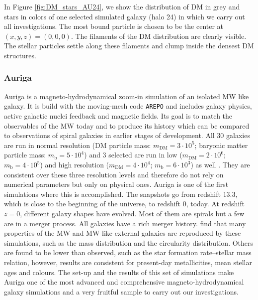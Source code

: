 In Figure \ref{fig:DM_stars_AU24}, we show the distribution of \ac{DM} in grey and stars in colors of one selected simulated galaxy (halo 24) in which we carry out all investigations. The most bound particle is chosen to be the center at $(x,y,z) = (0,0,0)$. The filaments of the \ac{DM} distribution are clearly visible. The stellar particles settle along these filaments and clump inside the densest \ac{DM} structures. 

\subsubsection{Auriga}\label{subsubsec:auriga_intro}
Auriga is a magneto-hydrodynamical zoom-in simulation of an isolated \ac{MW} like galaxy. It is build with the moving-mesh code \texttt{AREPO} \citep{AREPO} and includes galaxy physics, active galactic nuclei feedback and magnetic fields. Its goal is to match the observables of the \ac{MW} today and to produce its history which can be compared to observations of spiral galaxies in earlier stages of development. All 30 galaxies are run in normal resolution (\ac{DM} particle mass: $m_\mathrm{DM} = 3\cdot10^5$; baryonic matter particle mass: $m_\mathrm{b} = 5\cdot10^4$) and 3 selected are run in low ($m_\mathrm{DM} = 2\cdot10^6$; $m_\mathrm{b} = 4\cdot10^5$) and high resolution ($m_\mathrm{DM} = 4\cdot10^4$; $m_\mathrm{b} = 6\cdot10^3$) as well . They are consistent over these three resolution levels and therefore do not rely on numerical parameters but only on physical ones. Auriga is one of the first simulations where this is accomplished. The snapshots go from redshift $13.3$, which is close to the beginning of the universe, to redshift $0$, today.  At redshift $z= 0$, different galaxy shapes have evolved. Most of them are spirals but a few are in a merger process. All galaxies have a rich merger history.  find that many properties of the \ac{MW} and \ac{MW} like external galaxies are reproduced by these simulations, such as the mass distribution and the circularity distribution. Others are found to be lower than observed, such as the star formation rate–stellar mass relation, however, results are consistent for present-day metallicities, mean stellar ages and colours. The set-up and the results of this set of simulations make Auriga one of the most advanced and comprehensive magneto-hydrodynamical galaxy simulations and a very fruitful sample to carry out our investigations. \\
